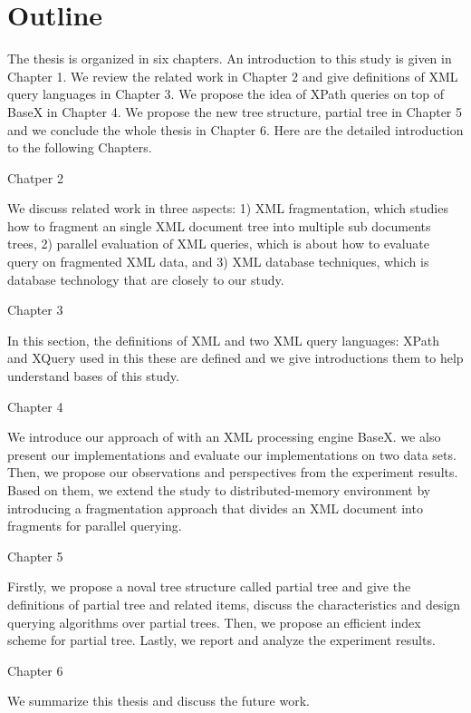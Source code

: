 \section{Outline}

The thesis is organized in six chapters. An introduction to this study is given
in Chapter 1. We  review the related work in Chapter 2 and give definitions of
XML query languages in Chapter 3. We propose the idea of XPath queries on top of
BaseX in Chapter 4. We propose the new tree structure, partial tree in Chapter 5
and  we conclude the whole thesis in Chapter 6. Here are the detailed
introduction to the following Chapters.

Chatper 2

We discuss related work in three aspects: 1) XML fragmentation, which studies how
to fragment an single XML document tree into multiple sub documents trees, 2)
parallel evaluation of XML queries, which is about how to evaluate query on
fragmented XML data, and  3) XML database techniques, which is database
technology that are  closely to our study.

Chapter 3

In this section, the definitions of XML and two XML query languages: XPath and
XQuery used in this these are defined and we give introductions them to help
understand bases of this study.

Chapter 4

We introduce our approach of \cite{BoLS09} with an XML processing engine BaseX.
we also present our implementations and evaluate our implementations on two data
sets. Then, we propose our observations and perspectives from the experiment
results. Based on them, we extend the study to distributed-memory environment by
introducing a fragmentation approach that divides an XML document into fragments
for parallel querying. 

Chapter 5

Firstly, we propose a noval tree structure called partial tree and give the
definitions of partial tree and related items, discuss the characteristics  and
design querying algorithms over partial trees. Then, we propose an  efficient
index scheme for partial tree. Lastly, we report  and analyze the experiment
results.

Chapter 6

We summarize this thesis and discuss the future work.
